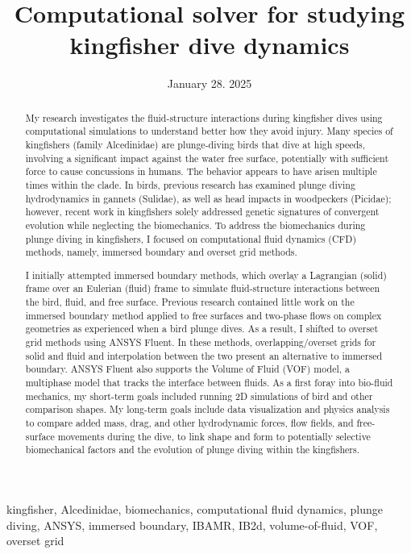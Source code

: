 \documentclass[12pt,conference,onecolumn]{IEEEtran}
\title{Computational solver for studying kingfisher dive dynamics }
\author{%
\IEEEauthorblockN{Pooja Thaker}\IEEEauthorblockA{Science \& Engineering\\Manalapan High School\\Englishtown, NJ\\425pthaker@frhsd.com}}
\date{January 28. 2025}
\newcommand{\keywords}{kingfisher, Alcedinidae, biomechanics, computational fluid dynamics, plunge diving, ANSYS, immersed boundary, IBAMR, IB2d, volume-of-fluid, VOF, overset grid}
\begin{document}
\maketitle 

\begin{abstract}
My research investigates the fluid-structure interactions during kingfisher dives using computational  simulations to understand better how they avoid injury. Many species of kingfishers (family Alcedinidae) are plunge-diving birds that dive at high speeds, involving a significant impact against the water free surface, potentially with sufficient force to cause concussions in humans. The behavior appears to have arisen multiple times within the clade. In birds, previous research has examined plunge diving hydrodynamics in gannets (Sulidae), as well as head impacts in woodpeckers (Picidae); however, recent work in kingfishers solely addressed genetic signatures of convergent evolution while neglecting the biomechanics. To address the biomechanics during plunge diving in kingfishers, I focused on computational fluid dynamics (CFD) methods, namely, immersed boundary and overset grid methods. 

I initially attempted immersed boundary methods, which overlay a Lagrangian (solid) frame over an Eulerian (fluid) frame to simulate fluid-structure interactions between the bird, fluid, and free surface. Previous research contained little work on the immersed boundary method applied to free surfaces and two-phase flows on complex geometries as experienced when a bird plunge dives. As a result, I shifted to overset grid methods using ANSYS Fluent. In these methods, overlapping/overset grids for solid and fluid and interpolation between the two present an alternative to immersed boundary. ANSYS Fluent also supports the Volume of Fluid (VOF) model, a multiphase model that tracks the interface between fluids.  As a first foray into bio-fluid mechanics, my short-term goals included running 2D simulations of bird and other comparison shapes. My long-term goals include data visualization and physics analysis to compare added mass, drag, and other hydrodynamic forces, flow fields, and free-surface movements during the dive, to link shape and form to potentially selective biomechanical factors and the evolution of plunge diving within the kingfishers. 
\end{abstract}

\begin{IEEEkeywords}
\keywords
\end{IEEEkeywords}
\end{document}
